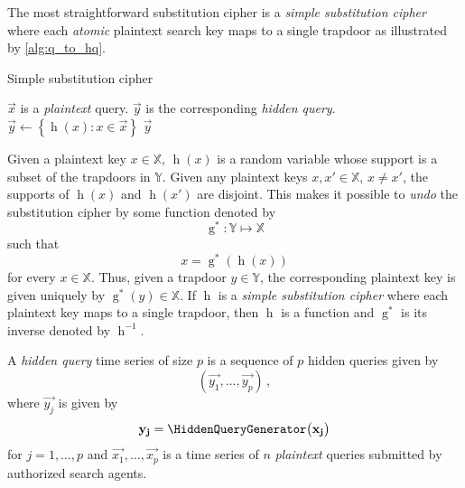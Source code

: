 \documentclass[ ../main.tex]{subfiles}
\begin{document}
The most straightforward substitution cipher is a \emph{simple substitution cipher} where each \emph{atomic} plaintext search key maps to a single trapdoor as illustrated by \cref{alg:q_to_hq}.
\begin{algorithm}[h]
    \caption{Simple substitution cipher}
    \label{alg:q_to_hq}
    \KwIn
    {
        $\vec{x}$ is a \emph{plaintext} query.
    }
    \KwOut
    {
        $\vec{y}$ is the corresponding \emph{hidden query}.
    }
    {
        $\vec{y} \gets \left\{\operatorname{h}(x) \colon x \in \vec{x}\right\}$\;
        \Return $\vec{y}$\;
    }
\end{algorithm}

Given a plaintext key $x \in \mathbb{X}$, $\operatorname{h}(x)$ is a random variable whose support is a subset of the trapdoors in $\mathbb{Y}$. Given any plaintext keys $x,x' \in \mathbb{X}$, $x \neq x'$, the supports of $\operatorname{h}(x)$ and $\operatorname{h}(x')$ are disjoint. This makes it possible to \emph{undo} the substitution cipher by some function denoted by
\begin{equation}
    \operatorname{g}^* \colon \mathbb{Y} \mapsto \mathbb{X}
\end{equation}
such that
\[
    x = \operatorname{g}^*\!\left(\operatorname{h}\!\left(x\right)\right)
\]
for every $x \in \mathbb{X}$. Thus, given a trapdoor $y \in \mathbb{Y}$, the corresponding plaintext key is given uniquely by $\operatorname{g}^*(y) \in \mathbb{X}$. If $\operatorname{h}$ is a \emph{simple substitution cipher} where each plaintext key maps to a single trapdoor, then $\operatorname{h}$ is a function and $\operatorname{g}^*$ is its inverse denoted by $\operatorname{h}^{-1}$.

\begin{definition}
A \emph{hidden query} time series of size $p$ is a sequence of $p$ hidden queries given by
\begin{equation}
    \left(\vec{y_1}, \ldots, \vec{y_p}\right)\,,
\end{equation}
where $\vec{y_j}$ is given by
\begin{equation}
    \vec{y_j} = \HiddenQueryGenerator\!\left(\vec{x_j}\right)
\end{equation}
for $j=1,\ldots,p$ and $\vec{x_1},\ldots,\vec{x_p}$ is a time series of $n$ \emph{plaintext} queries submitted by authorized search agents.
\end{definition}
\end{document}
